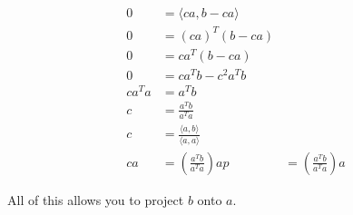 \begin{align*}
	0 &= \langle ca, b-ca \rangle \\
	0 &= (ca)^T(b-ca) \\
	0 &= ca^T (b-ca) \\
	0 &= ca^Tb-c^2a^Tb \\
	ca^Ta  &= a^Tb \\
	c &= \frac{a^Tb}{a^Ta} \\
	c &= \frac{\langle a,b \rangle}{\langle a,a \rangle} \\
	ca &=  (\frac{a^Tb}{a^Ta})a 
 	p &=   (\frac{a^Tb}{a^Ta})a
\end{align*}

All of this allows you to project $b$ onto $a$.

